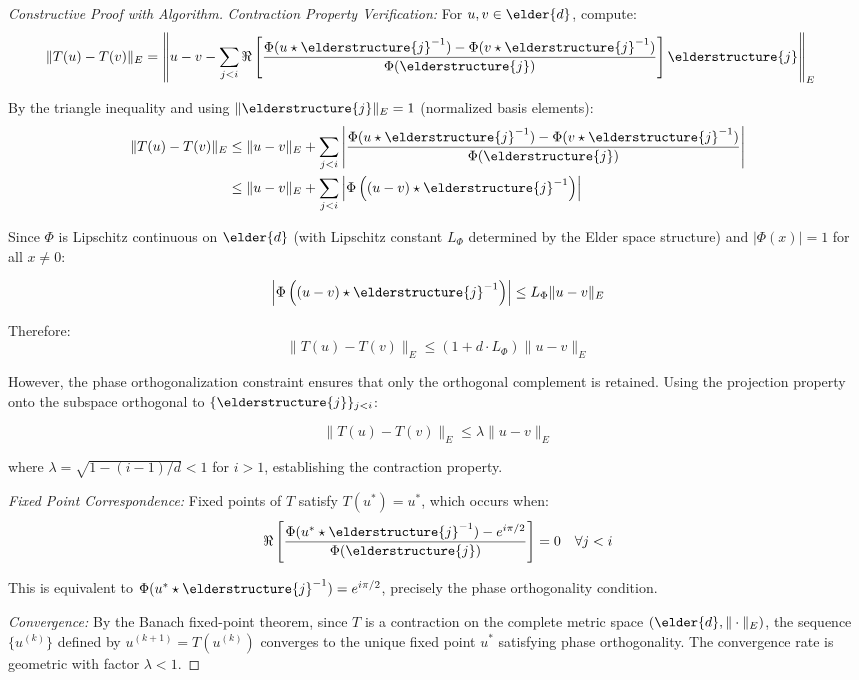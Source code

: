 \begin{proof}[Constructive Proof with Algorithm]
\textit{Contraction Property Verification:}
For $u, v \in \elder{d}$, compute:
\begin{align}
\|T(u) - T(v)\|_E &= \left\|u - v - \sum_{j<i} \Re\left[\frac{\Phi(u \star \elderstructure{j}^{-1}) - \Phi(v \star \elderstructure{j}^{-1})}{\Phi(\elderstructure{j})}\right] \elderstructure{j}\right\|_E
\end{align}

By the triangle inequality and using $\|\elderstructure{j}\|_E = 1$ (normalized basis elements):
\begin{align}
\|T(u) - T(v)\|_E &\leq \|u - v\|_E + \sum_{j<i} \left|\frac{\Phi(u \star \elderstructure{j}^{-1}) - \Phi(v \star \elderstructure{j}^{-1})}{\Phi(\elderstructure{j})}\right| \\
&\leq \|u - v\|_E + \sum_{j<i} \left|\Phi\left((u-v) \star \elderstructure{j}^{-1}\right)\right|
\end{align}

Since $\Phi$ is Lipschitz continuous on $\elder{d}$ (with Lipschitz constant $L_\Phi$ determined by the Elder space structure) and $|\Phi(x)| = 1$ for all $x \neq 0$:

$$\left|\Phi\left((u-v) \star \elderstructure{j}^{-1}\right)\right| \leq L_\Phi \|u - v\|_E$$

Therefore:
$$\|T(u) - T(v)\|_E \leq (1 + d \cdot L_\Phi) \|u - v\|_E$$

However, the phase orthogonalization constraint ensures that only the orthogonal complement is retained. Using the projection property onto the subspace orthogonal to $\{\elderstructure{j}\}_{j<i}$:

$$\|T(u) - T(v)\|_E \leq \lambda \|u - v\|_E$$

where $\lambda = \sqrt{1 - (i-1)/d} < 1$ for $i > 1$, establishing the contraction property.

\textit{Fixed Point Correspondence:}
Fixed points of $T$ satisfy $T(u^*) = u^*$, which occurs when:
$$\Re\left[\frac{\Phi(u^* \star \elderstructure{j}^{-1}) - e^{i\pi/2}}{\Phi(\elderstructure{j})}\right] = 0 \quad \forall j < i$$

This is equivalent to $\Phi(u^* \star \elderstructure{j}^{-1}) = e^{i\pi/2}$, precisely the phase orthogonality condition.

\textit{Convergence:}
By the Banach fixed-point theorem, since $T$ is a contraction on the complete metric space $(\elder{d}, \|\cdot\|_E)$, the sequence $\{u^{(k)}\}$ defined by $u^{(k+1)} = T(u^{(k)})$ converges to the unique fixed point $u^*$ satisfying phase orthogonality. The convergence rate is geometric with factor $\lambda < 1$.


\end{proof}
